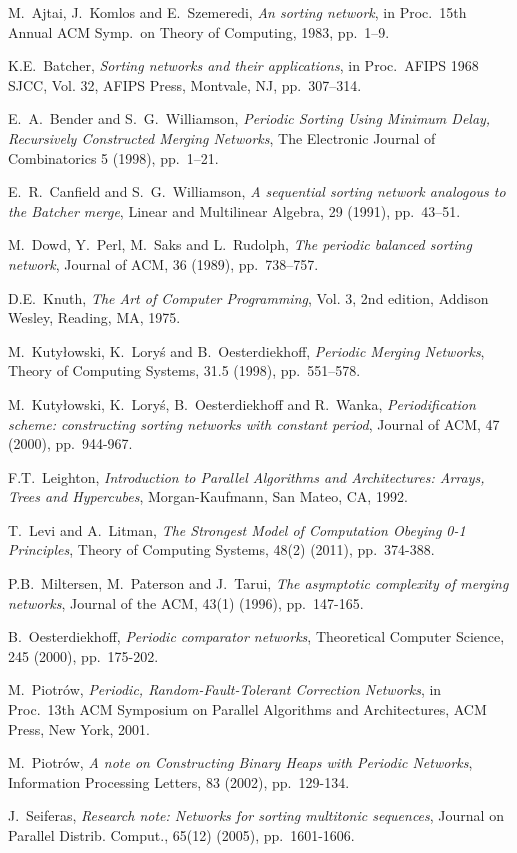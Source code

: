 \documentclass{llncs}
\begin{document}
\begin{thebibliography}{99} 

 {\sc M.~Ajtai, J.~Komlos and E.~Szemeredi}, {\em An  sorting network}, in Proc.\ 15th Annual ACM Symp.\ on Theory
  of Computing, 1983, pp.~1--9.

 {\sc K.E.~Batcher}, {\em Sorting networks and their
  applications}, in Proc.\ AFIPS 1968 SJCC, Vol. 32, AFIPS Press,
  Montvale, NJ, pp.~307--314.

 {\sc E.~A.~Bender and S.~G.~Williamson}, {\em  Periodic
  Sorting Using Minimum Delay, Recursively Constructed Merging
  Networks}, The Electronic Journal of Combinatorics 5 (1998), pp.~1--21.

 {\sc E.~R.~Canfield and S.~G.~Williamson}, {\em A
  sequential sorting network analogous to the Batcher merge}, Linear and
  Multilinear Algebra, 29 (1991), pp.~43--51.

 {\sc M.~Dowd, Y.~Perl, M.~Saks and L.~Rudolph}, {\em The
  periodic balanced sorting network}, Journal of ACM, 36 (1989),
  pp.~738--757.

 {\sc D.E.~Knuth}, {\em The Art of Computer Programming},
  Vol. 3, 2nd edition, Addison Wesley, Reading, MA, 1975.

 {\sc M.~Kuty{\l}owski, K.~Lory{\'s} and
  B.~Oesterdiekhoff}, {\em Periodic Merging Networks}, Theory of
  Computing Systems, 31.5 (1998), pp.~551--578.

 {\sc M.~Kuty{\l}owski, K.~Lory{\'s}, B.~Oesterdiekhoff
  and R.~Wanka}, {\em Periodification scheme: constructing sorting
  networks with constant period}, Journal of ACM, 47 (2000),
  pp.~944-967. 

 {\sc F.T.~Leighton}, {\em Introduction to Parallel
  Algorithms and Architectures{\rm :} Arrays, Trees and Hypercubes},
  Morgan-Kaufmann, San Mateo, CA, 1992.
  
 {\sc  T.~Levi and A.~Litman}, {\em The Strongest Model of 
Computation Obeying 0-1 Principles}, Theory of Computing Systems, 48(2) 
(2011), pp.~374-388.

 {\sc P.B.~Miltersen, M.~Paterson and J.~Tarui}, {\em The 
asymptotic complexity of merging networks}, Journal of the ACM, 43(1) (1996), 
pp.~147-165.

 {\sc B.~Oesterdiekhoff}, {\em Periodic comparator networks},
  Theoretical Computer Science, 245 (2000), pp.~175-202.

 {\sc M.~Piotr{\'o}w}, {\em Periodic, Random-Fault-Tolerant
  Correction Networks}, in Proc.\ 13th ACM Symposium on Parallel
  Algorithms and Architectures, ACM Press, New York, 2001.

 {\sc M.~Piotr{\'o}w}, {\em A note on Constructing Binary
  Heaps with Periodic Networks}, Information Processing Letters, 83
  (2002), pp.~129-134.

 {\sc J.~Seiferas}, {\em Research note: Networks for sorting 
multitonic sequences}, Journal on Parallel Distrib. Comput., 65(12) (2005), 
pp.~1601-1606.

\end{thebibliography}
\end{document}
